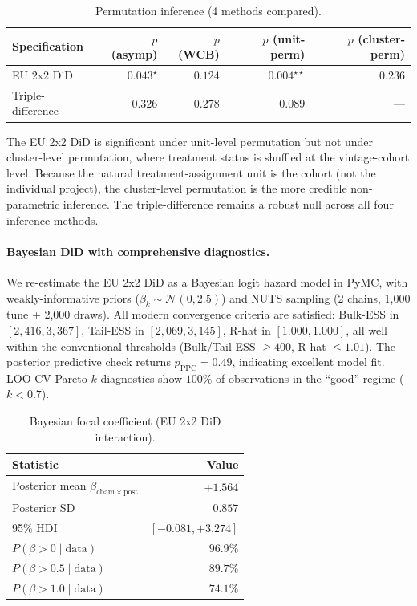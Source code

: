 \documentclass[11pt,a4paper]{article}
\begin{document}
\begin{table}[ht]
\centering
\caption{Permutation inference (4 methods compared).}
\label{tab:ch8-permutation}
\begin{tabular}{lrrrr}
\toprule
Specification & $p$ (asymp) & $p$ (WCB) & $p$ (unit-perm) & $p$ (cluster-perm) \\
\midrule
EU 2x2 DiD & $0.043^{\star}$ & $0.124$ & $0.004^{\star\star}$ & $0.236$ \\
Triple-difference & $0.326$ & $0.278$ & $0.089$ & --- \\
\bottomrule
\end{tabular}
\end{table}

The EU 2x2 DiD is significant under unit-level permutation but not under cluster-level permutation, where treatment status is shuffled at the vintage-cohort level. Because the natural treatment-assignment unit is the cohort (not the individual project), the cluster-level permutation is the more credible non-parametric inference. The triple-difference remains a robust null across all four inference methods.

\paragraph{Bayesian DiD with comprehensive diagnostics.} We re-estimate the EU 2x2 DiD as a Bayesian logit hazard model in PyMC, with weakly-informative priors ($\beta_k \sim \mathcal{N}(0, 2.5)$) and NUTS sampling (2 chains, 1{,}000 tune + 2{,}000 draws). All modern convergence criteria \citep{vehtari2021improved} are satisfied: Bulk-ESS in $[2{,}416, 3{,}367]$, Tail-ESS in $[2{,}069, 3{,}145]$, R-hat in $[1.000, 1.000]$, all well within the conventional thresholds (Bulk/Tail-ESS $\geq 400$, R-hat $\leq 1.01$). The posterior predictive check returns $p_{\mathrm{PPC}} = 0.49$, indicating excellent model fit. LOO-CV Pareto-$k$ diagnostics show $100\%$ of observations in the ``good'' regime ($k < 0.7$).

\begin{table}[ht]
\centering
\caption{Bayesian focal coefficient (EU 2x2 DiD interaction).}
\label{tab:ch8-bayes}
\begin{tabular}{lr}
\toprule
Statistic & Value \\
\midrule
Posterior mean $\beta_{\mathrm{cbam} \times \mathrm{post}}$ & $+1.564$ \\
Posterior SD & $0.857$ \\
95\% HDI & $[-0.081, +3.274]$ \\
$P(\beta > 0 \mid \mathrm{data})$ & $96.9\%$ \\
$P(\beta > 0.5 \mid \mathrm{data})$ & $89.7\%$ \\
$P(\beta > 1.0 \mid \mathrm{data})$ & $74.1\%$ \\
\bottomrule
\end{tabular}
\end{table}
\end{document}
